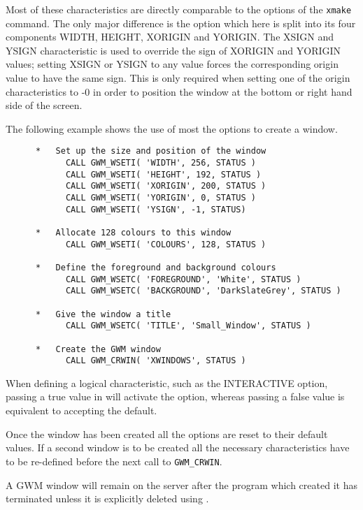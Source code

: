 Most of these characteristics are directly comparable to the options
of the {\tt xmake} command. The only major difference is the 
option which here is split into its four components WIDTH, HEIGHT, XORIGIN
and YORIGIN. The XSIGN and YSIGN characteristic is used to override the sign of
XORIGIN and YORIGIN values; setting XSIGN or YSIGN
to any value forces the corresponding origin value to have the same
sign. This is only required when setting one of the
origin characteristics to -0 in order to position the window at the
bottom or right hand side of the screen.

The following example shows the use of most the options to create a window.

\begin{small}
\begin{verbatim}
      *   Set up the size and position of the window
            CALL GWM_WSETI( 'WIDTH', 256, STATUS )
            CALL GWM_WSETI( 'HEIGHT', 192, STATUS )
            CALL GWM_WSETI( 'XORIGIN', 200, STATUS )
            CALL GWM_WSETI( 'YORIGIN', 0, STATUS )
            CALL GWM_WSETI( 'YSIGN', -1, STATUS)

      *   Allocate 128 colours to this window
            CALL GWM_WSETI( 'COLOURS', 128, STATUS )

      *   Define the foreground and background colours
            CALL GWM_WSETC( 'FOREGROUND', 'White', STATUS )
            CALL GWM_WSETC( 'BACKGROUND', 'DarkSlateGrey', STATUS )

      *   Give the window a title
            CALL GWM_WSETC( 'TITLE', 'Small_Window', STATUS )

      *   Create the GWM window
            CALL GWM_CRWIN( 'XWINDOWS', STATUS )
\end{verbatim}
\end{small}

When defining a logical characteristic, such as the INTERACTIVE option,
passing a true value in 
will activate the option,
whereas passing a false value is equivalent to accepting the default.

Once the window has been created all the options are reset to their
default values. If a second window is to be created all the necessary
characteristics have to be re-defined before the next call to
{\tt GWM\_CRWIN}.

A GWM window will remain on the server after the program which created
it has terminated unless it is explicitly deleted using 
.


